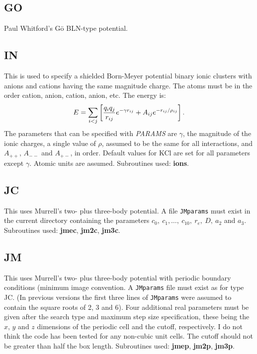 \documentclass[12pt,a4paper,dvips]{article}
\begin{document}
\subsection{GO}Paul Whitford's G\={o} BLN-type potential.

\subsection{IN}This is used to specify a shielded Born-Meyer potential binary ionic clusters with
anions and cations having the same magnitude charge.
The atoms must be in the order cation, anion, cation, anion, etc. The energy is:
$$ E = \sum_{i<j} \left[ {q_iq_j\over r_{ij}} e^{-\gamma r_{ij}} + A_{ij}e^{-r_{ij}/\rho_{ij}} \right]. $$
The parameters that can
be specified with {\it PARAMS\/} are $\gamma$, the magnitude of the ionic charges, a single
value of $\rho$, assumed to be the same for all interactions, and $A_{++}$, $A_{--}$ and
$A_{+-}$, in order. Default values for KCl are set for all parameters except $\gamma$.
Atomic units are assumed. Subroutines used: {\bf ions}.

\subsection{JC}This uses Murrell's two- plus three-body 
potential.\cite{murrellm90,murrellr90,alderzijmr91,eggenjlm92,fengjm93} 
A file {\tt JMparams} must
exist in the current directory containing the parameters $c_0,\ c_1,\ldots,\ c_{10},\ r_e,\ 
D,\ a_2$ and $a_3$. Subroutines used: {\bf jmec}, {\bf jm2c}, {\bf jm3c}.

\subsection{JM}This uses Murrell's two- plus three-body 
potential\cite{murrellm90,murrellr90,alderzijmr91,eggenjlm92,fengjm93} with periodic boundary
conditions (minimum image convention.\cite{allent87} 
A {\tt JMparams} file must exist as for type JC. (In previous versions the 
first three lines of {\tt JMparams} were assumed to contain
the square roots of 2, 3 and 6). Four additional real parameters must be given after the
search type and maximum step size specification, these being the $x$, $y$ and $z$ dimensions
of the periodic cell and the cutoff, respectively. I do not think the code has been tested
for any non-cubic unit cells. The cutoff should not be greater than half the box length.\cite{allent87}
Subroutines used: {\bf jmep}, {\bf jm2p}, {\bf jm3p}.
\end{document}
